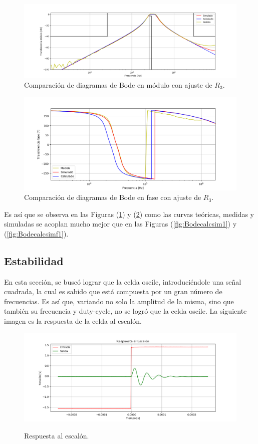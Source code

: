 \begin{figure}[H]
	\centering
	\includegraphics[width=\textwidth]{Imagenes-Ej2/BodeRauchCalcsimV2.png}
	\caption{Comparación de diagramas de Bode en módulo con ajuste de $R_3$.}
	\label{fig:Bodecalcsim2}
\end{figure}
\begin{figure}[H]
	\centering
	\includegraphics[width=\textwidth]{Imagenes-Ej2/BodeRauchCalcsimFV2.png}
	\caption{Comparación de diagramas de Bode en fase con ajuste de $R_3$.}
	\label{fig:Bodecalcsimf2}
\end{figure}

Es así que se observa en las Figuras (\ref{fig:Bodecalcsim2}) y (\ref{fig:Bodecalcsimf2}) como las curvas teóricas, medidas y simuladas se acoplan mucho mejor que en las Figuras (\ref{fig:Bodecalcsim1}) y (\ref{fig:Bodecalcsimf1}).

\subsection{Estabilidad}
En esta sección, se buscó lograr que la celda oscile, introduciéndole una señal cuadrada, la cual es sabido que está compuesta por un gran número de frecuencias. Es así que, variando no solo la amplitud de la misma, sino que también su frecuencia y duty-cycle, no se logró que la celda oscile. La siguiente imagen es la respuesta de la celda al escalón.
\begin{figure}[H]
	\centering
	\includegraphics[width=\textwidth]{Imagenes-Ej2/Step.png}
	\label{fig:stepresponse}
	\caption{Respuesta al escalón.}
\end{figure}

